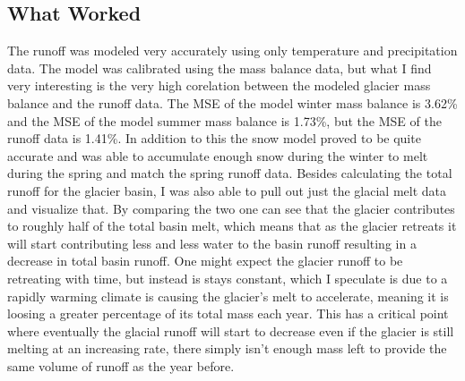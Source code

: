 \documentclass{article}
\begin{document}
\subsection{What Worked}
The runoff was modeled very accurately using only temperature and precipitation data. The model was calibrated using the mass balance data, 
but what I find very interesting is the very high corelation between the modeled glacier mass balance and the runoff data. The MSE of the 
model winter mass balance is 3.62\% and the MSE of the model summer mass balance is 1.73\%, but the MSE of the runoff data is 1.41\%. In 
addition to this the snow model proved to be quite accurate and was able to accumulate enough snow during the winter to melt during the 
spring and match the spring runoff data. Besides calculating the total runoff for the glacier basin, I was also able to pull out just the 
glacial melt data and visualize that. By comparing the two one can see that the glacier contributes to roughly half of the total basin melt, 
which means that as the glacier retreats it will start contributing less and less water to the basin runoff resulting in a decrease in total 
basin runoff. One might expect the glacier runoff to be retreating with time, but instead is stays constant, which I speculate is due to a 
rapidly warming climate is causing the glacier's melt to accelerate, meaning it is loosing a greater percentage of its total mass each year. 
This has a critical point where eventually the glacial runoff will start to decrease even if the glacier is still melting at an increasing 
rate, there simply isn't enough mass left to provide the same volume of runoff as the year before.
\end{document}
